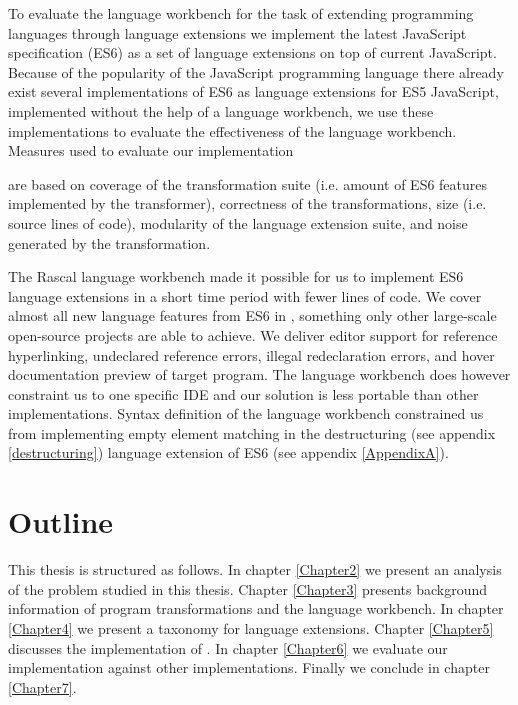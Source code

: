 To evaluate the language workbench for the task of extending programming languages through language extensions we implement the latest JavaScript specification (ES6) as a set of language extensions on top of current JavaScript. Because of the popularity of the JavaScript programming language there already exist several implementations of ES6 as language extensions for ES5 JavaScript, implemented without the help of a language workbench, we use these implementations to evaluate the effectiveness of the language workbench. Measures used to evaluate our implementation 

are based on coverage of the transformation suite (i.e. amount of ES6 features implemented by the transformer), correctness of the transformations, size (i.e. source lines of code), modularity of the language extension suite, and noise generated by the transformation.

The Rascal language workbench made it possible for us to implement ES6 language extensions in a short time period with fewer lines of code. We cover almost all new language features from ES6 in \projectname, something only other large-scale open-source projects are able to achieve. We deliver editor support for reference hyperlinking, undeclared reference errors, illegal redeclaration errors, and hover documentation preview of target program. The language workbench does however constraint us to one specific IDE and our solution is less portable than other implementations. Syntax definition of the language workbench constrained us from implementing empty element matching in the destructuring (see appendix \ref{destructuring}) language extension of ES6 (see appendix \ref{AppendixA}).

\section{Outline}
This thesis is structured as follows. In chapter \ref{Chapter2} we present an analysis of the problem studied in this thesis. Chapter \ref{Chapter3} presents background information of program transformations and the language workbench. In chapter \ref{Chapter4} we present a taxonomy for language extensions.  Chapter \ref{Chapter5} discusses the implementation of \projectname. In chapter \ref{Chapter6} we evaluate our implementation against other implementations. Finally we conclude in chapter \ref{Chapter7}.
